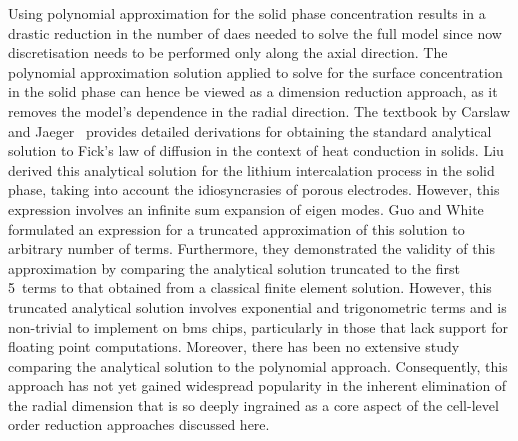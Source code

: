 Using polynomial  approximation for the  solid phase concentration results  in a
drastic reduction  in the number of  \glspl{dae} needed to solve  the full model
since now discretisation  needs to be performed only along  the axial direction.
The  polynomial  approximation  solution  applied   to  solve  for  the  surface
concentration in  the solid phase can  hence be viewed as  a dimension reduction
approach, as  it removes  the model's  dependence in  the radial  direction. The
textbook by Carslaw and  Jaeger~\cite{Carslaw1947} provides detailed derivations
for obtaining the standard analytical solution to Fick's law of diffusion in the
context of heat conduction in solids. Liu~\cite{Liu2006} derived this analytical
solution for the  lithium intercalation process in the solid  phase, taking into
account  the idiosyncrasies  of porous  electrodes. However, this  expression involves an  infinite sum
expansion of eigen modes. Guo  and White~\cite{Guo2012} formulated an expression
for a  truncated approximation of  this solution  to arbitrary number  of terms.
Furthermore, they demonstrated  the validity of this  approximation by comparing
the analytical solution truncated  to the first 5~terms to  that obtained from a
classical finite  element solution. However, this  truncated analytical solution
involves exponential and trigonometric terms  and is non-trivial to implement on
\gls{bms}  chips, particularly  in those  that lack  support for  floating point
computations.  Moreover,  there  has  been  no  extensive  study  comparing  the
analytical solution to the polynomial  approach. Consequently, this approach has
not yet gained  widespread popularity in the inherent elimination  of the radial
dimension that is so  deeply ingrained as a core aspect  of the cell-level order
reduction  approaches  discussed  here.


